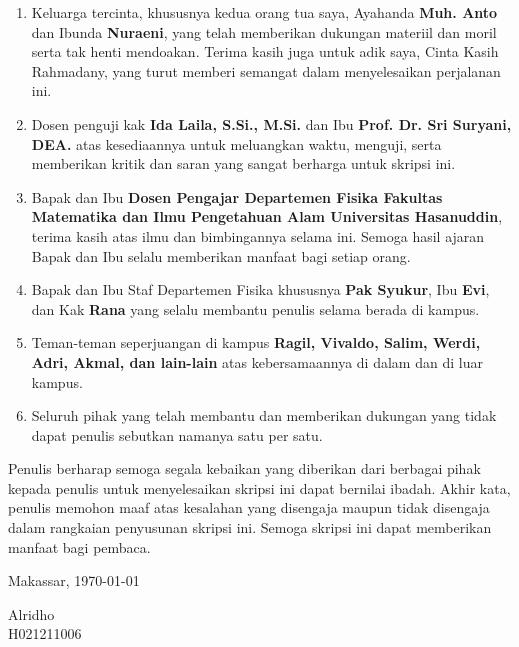 \begin{enumerate}
  \item Keluarga tercinta, khususnya kedua orang tua saya, Ayahanda
    \textbf{Muh. Anto} dan Ibunda \textbf{Nuraeni}, yang telah
    memberikan dukungan materiil dan moril serta tak henti mendoakan.
    Terima kasih juga untuk adik saya, Cinta Kasih Rahmadany, yang
    turut memberi semangat dalam menyelesaikan perjalanan ini.
  \item Dosen penguji kak \textbf{Ida Laila, S.Si., M.Si.} dan Ibu
    \textbf{Prof. Dr. Sri Suryani, DEA.} atas kesediaannya untuk
    meluangkan waktu, menguji, serta memberikan kritik dan saran yang
    sangat berharga untuk skripsi ini.
  \item Bapak dan Ibu \textbf{Dosen Pengajar Departemen Fisika Fakultas
    Matematika dan Ilmu Pengetahuan Alam Universitas Hasanuddin},
    terima kasih atas ilmu dan bimbingannya selama ini. Semoga hasil
    ajaran Bapak dan Ibu selalu memberikan manfaat bagi setiap orang.
  \item Bapak dan Ibu Staf Departemen Fisika khususnya \textbf{Pak Syukur},
    Ibu \textbf{Evi}, dan Kak \textbf{Rana} yang selalu membantu penulis
    selama berada di kampus.
  \item Teman-teman seperjuangan di kampus \textbf{Ragil, Vivaldo, Salim,
    Werdi, Adri, Akmal, dan lain-lain} atas kebersamaannya di dalam
    dan di luar kampus.
  \item Seluruh pihak yang telah membantu dan memberikan dukungan
    yang tidak dapat penulis sebutkan namanya satu per satu.
\end{enumerate}

Penulis berharap semoga segala kebaikan yang diberikan dari berbagai
pihak kepada penulis untuk menyelesaikan skripsi ini dapat bernilai
ibadah. Akhir kata, penulis memohon maaf atas kesalahan yang
disengaja maupun tidak disengaja dalam rangkaian penyusunan skripsi
ini. Semoga skripsi ini dapat memberikan manfaat bagi pembaca.

\vspace{2cm}

\hfill
\begin{minipage}{0.4\textwidth}
  \raggedleft
  Makassar, \today \par
  \vspace{2cm}
  Alridho \\
  H021211006
\end{minipage}
\endgroup
